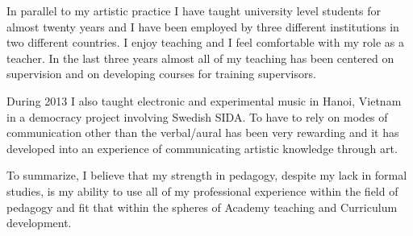 \documentclass[a4paper]{article}
\begin{document}
In parallel to my artistic practice I have taught university level students for almost twenty years and I have been employed by three different institutions in two different countries. I enjoy teaching and I feel comfortable with my role as a teacher. In the last three years almost all of my teaching has been centered on supervision and on developing courses for training supervisors.

During 2013 I also taught electronic and experimental music in Hanoi, Vietnam in a democracy project involving Swedish SIDA. To have to rely on modes of communication other than the verbal/aural has been very rewarding and it has developed into an experience of communicating artistic knowledge through art.

To summarize, I believe that my strength in pedagogy, despite my lack in formal studies, is my ability to use all of my professional experience within the field of pedagogy and fit that within the spheres of Academy teaching and Curriculum development.




\newpage


\end{document}
